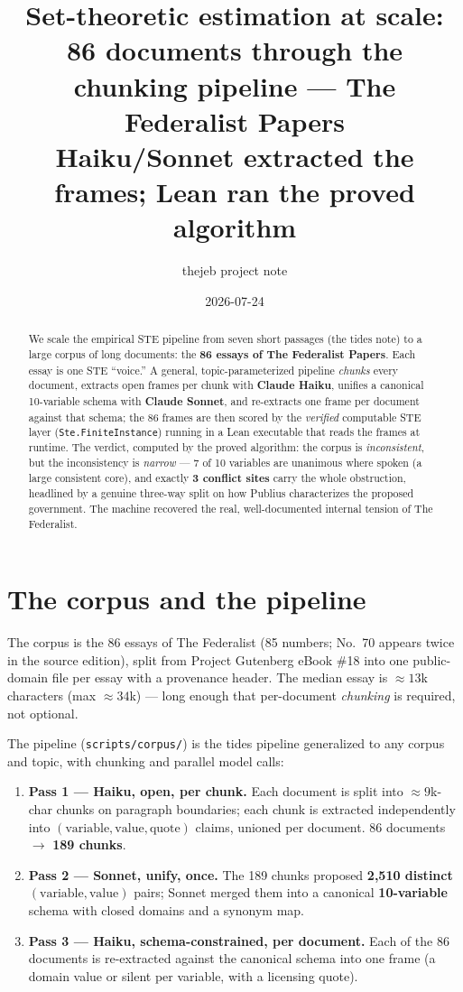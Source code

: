 \documentclass[11pt]{article}
\title{Set-theoretic estimation at scale: 86 documents through the\\
chunking pipeline --- The Federalist Papers\\
\large Haiku/Sonnet extracted the frames; Lean ran the proved algorithm}
\author{thejeb project note}
\date{2026-07-24}
\newcommand{\lean}[1]{\texttt{#1}}
\newcommand{\vv}[1]{\textsf{\small #1}}
\begin{document}
\maketitle

\begin{abstract}
We scale the empirical STE pipeline from seven short passages (the tides
note) to a large corpus of long documents: the \textbf{86 essays of The
Federalist Papers}. Each essay is one STE ``voice.'' A general,
topic-parameterized pipeline \emph{chunks} every document, extracts open
frames per chunk with \textbf{Claude Haiku}, unifies a canonical
10-variable schema with \textbf{Claude Sonnet}, and re-extracts one frame
per document against that schema; the 86 frames are then scored by the
\emph{verified} computable STE layer (\lean{Ste.FiniteInstance}) running in
a Lean executable that reads the frames at runtime. The verdict, computed
by the proved algorithm: the corpus is \emph{inconsistent}, but the
inconsistency is \emph{narrow} --- 7 of 10 variables are unanimous where
spoken (a large consistent core), and exactly \textbf{3 conflict sites}
carry the whole obstruction, headlined by a genuine three-way split on how
Publius characterizes the proposed government. The machine recovered the
real, well-documented internal tension of The Federalist.
\end{abstract}

\section{The corpus and the pipeline}

The corpus is the 86 essays of The Federalist \citep{hamilton1788federalist}
(85 numbers; No.~70 appears twice in the source edition), split from Project
Gutenberg eBook \#18 into one public-domain file per essay with a provenance
header. The median essay is $\approx 13$k characters (max $\approx 34$k) ---
long enough that per-document \emph{chunking} is required, not optional.

The pipeline (\lean{scripts/corpus/}) is the tides pipeline generalized to
any corpus and topic, with chunking and parallel model calls:

\begin{enumerate}
\item \textbf{Pass 1 --- Haiku, open, per chunk.} Each document is split into
  $\approx 9$k-char chunks on paragraph boundaries; each chunk is extracted
  independently into $(\text{variable},\text{value},\text{quote})$ claims,
  unioned per document. $86$ documents $\rightarrow$ \textbf{189 chunks}.
\item \textbf{Pass 2 --- Sonnet, unify, once.} The 189 chunks proposed
  \textbf{2{,}510 distinct} $(\text{variable},\text{value})$ pairs; Sonnet
  merged them into a canonical \textbf{10-variable} schema with closed
  domains and a synonym map.
\item \textbf{Pass 3 --- Haiku, schema-constrained, per document.} Each of
  the 86 documents is re-extracted against the canonical schema into one
  frame (a domain value or \vv{silent} per variable, with a licensing
  quote).
\end{enumerate}
\end{document}
